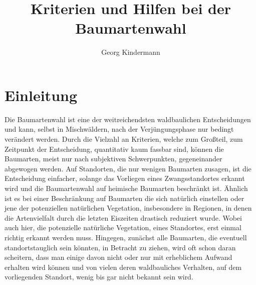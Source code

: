 \documentclass[twocolumn]{scrartcl}
\title{Kriterien und Hilfen bei der Baumartenwahl}
\author{Georg Kindermann}
\begin{document}

\tableofcontents

\section{Einleitung}

Die Baumartenwahl ist eine der weitreichendsten waldbaulichen
Entscheidungen und kann, selbst in Mischwäldern, nach der
Verjüngungsphase nur bedingt verändert werden. Durch die Vielzahl an
Kriterien, welche zum Großteil, zum Zeitpunkt der Entscheidung,
quantitativ kaum fassbar sind, können die Baumarten, meist nur nach
subjektiven Schwerpunkten, gegeneinander abgewogen werden. Auf
Standorten, die nur wenigen Baumarten zusagen, ist die Entscheidung
einfacher, solange das Vorliegen eines Zwangsstandortes erkannt wird
und die Baumartenwahl auf heimische Baumarten beschränkt ist. Ähnlich
ist es bei einer Beschränkung auf Baumarten die sich natürlich
einstellen oder jene der potenziellen natürlichen Vegetation,
insbesondere in Regionen, in denen die Artenvielfalt durch die letzten
Eiszeiten drastisch reduziert wurde. Wobei auch hier, die potenzielle
natürliche Vegetation, eines Standortes, erst einmal richtig erkannt
werden muss. Hingegen, zunächst alle Baumarten, die eventuell
standortstauglich sein könnten, in Betracht zu ziehen, wird oft schon
daran scheitern, dass man einige davon nicht oder nur mit erheblichem
Aufwand erhalten wird können und von vielen deren waldbauliches
Verhalten, auf dem vorliegenden Standort, wenig bis gar nicht bekannt
sein wird.
\end{document}
